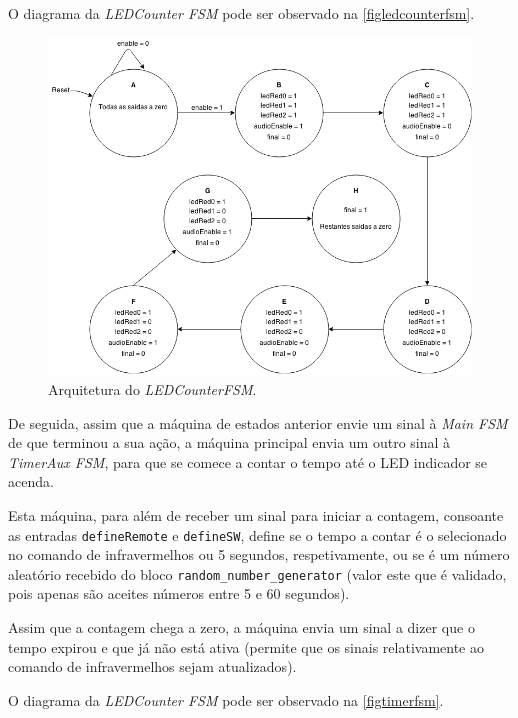 \documentclass[a4paper,11pt,onecolumn]{report}
\begin{document}
O diagrama da \textit{LEDCounter FSM} pode ser observado na \autoref{figledcounterfsm}.

\begin{figure}[h]
\centerline{\includegraphics[scale=0.30]{Images/LEDCounterFSMDiagram}}
\caption{Arquitetura do \textit{LEDCounterFSM}.}
\label{figledcounterfsm}
\end{figure}

De seguida, assim que a máquina de estados anterior envie um sinal à \textit{Main FSM} de que terminou a sua ação, a máquina principal envia um outro sinal à \textit{TimerAux FSM}, para que se comece a contar o tempo até o LED indicador se acenda.

Esta máquina, para além de receber um sinal para iniciar a contagem, consoante as entradas \texttt{defineRemote} e \texttt{defineSW}, define se o tempo a contar é o selecionado no comando de infravermelhos ou 5 segundos, respetivamente, ou se é um número aleatório recebido do bloco \texttt{random_number_generator} (valor este que é validado, pois apenas são aceites números entre 5 e 60 segundos).

Assim que a contagem chega a zero, a máquina envia um sinal a dizer que o tempo expirou e que já não está ativa (permite que os sinais relativamente ao comando de infravermelhos sejam atualizados).

O diagrama da \textit{LEDCounter FSM} pode ser observado na \autoref{figtimerfsm}.
\end{document}

